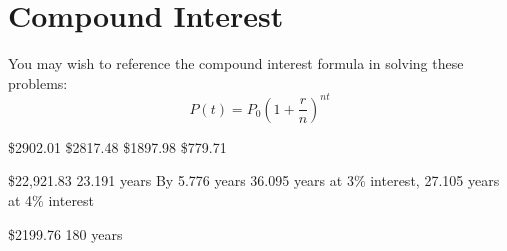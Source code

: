 \section*{Compound Interest}
You may wish to reference the compound interest formula in solving these problems:
$$P(t)=P_0\left(1+\frac{r}{n}\right)^{nt}$$
\begin{smenum}
\mitemxxxx
{\$2902.01}
{\$2817.48}
{\$1897.98}
{\$779.71}
\end{smenum}
\begin{senum}
\item
\begin{nmenum}
\mitemxxx
{\$22,921.83}
{23.191 years}
{By 5.776 years}
\mitemx
{36.095 years at 3\% interest, 27.105 years at 4\% interest}
\end{nmenum}
\item 
\begin{nmenum}
\mitemxxo
{\$2199.76}
{180 years}
\end{nmenum}
\end{senum}

